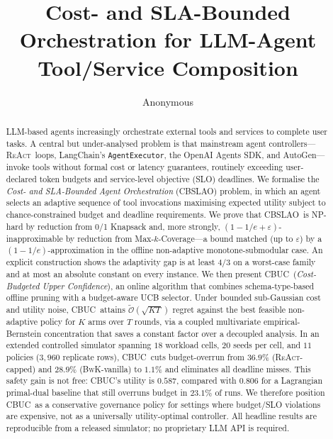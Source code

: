 \documentclass[runningheads]{llncs}
\title{Cost- and SLA-Bounded Orchestration for LLM-Agent Tool/Service Composition}
\author{Anonymous\inst{1}}
\institute{Anonymous Institution\\
\email{anon@example.org}}
\newcommand{\CBSLAO}{\textsc{CBSLAO}}
\newcommand{\CBUC}{\textsc{CBUC}}
\newcommand{\BwK}{\textsc{BwK}}
\newcommand{\ReAct}{\textsc{ReAct}}
\newcommand{\tOh}{\widetilde{\mathcal{O}}}
\begin{document}
\maketitle

\begin{abstract}
LLM-based agents increasingly orchestrate external tools and services
to complete user tasks. A central but under-analysed problem is that
mainstream agent controllers---\ReAct~loops, LangChain's
\texttt{AgentExecutor}, the OpenAI Agents SDK, and AutoGen---invoke
tools without formal cost or latency guarantees, routinely exceeding
user-declared token budgets and service-level objective (SLO) deadlines.
We formalise the \emph{Cost- and SLA-Bounded Agent Orchestration}
(\CBSLAO) problem, in which an agent selects an adaptive sequence of
tool invocations maximising expected utility subject to
chance-constrained budget and deadline requirements. We prove that
\CBSLAO~is NP-hard by reduction from 0/1 Knapsack and, more strongly,
$(1 - 1/e + \varepsilon)$-inapproximable by reduction from
Max-$k$-Coverage---a bound matched (up to $\varepsilon$) by a
$(1-1/e)$-approximation in the offline non-adaptive
monotone-submodular case. An explicit construction shows the
adaptivity gap is at least $4/3$ on a worst-case family and at most
an absolute constant on every instance. We then present \CBUC~(\emph{Cost-Budgeted Upper Confidence}), an
online algorithm that combines schema-type-based offline pruning with a
budget-aware UCB selector. Under bounded sub-Gaussian cost and utility
noise, \CBUC~attains $\tOh(\sqrt{KT})$ regret against the best
feasible non-adaptive policy for $K$ arms over $T$ rounds, via a
coupled multivariate empirical-Bernstein concentration that saves a
constant factor over a decoupled analysis.
In an extended controlled simulator spanning $18$ workload cells,
$20$ seeds per cell, and $11$ policies ($3{,}960$ replicate rows),
\CBUC~cuts budget-overrun from $36.9\%$ (\ReAct-capped) and $28.9\%$
(\BwK-vanilla) to $1.1\%$ and eliminates all deadline misses. This
safety gain is not free: \CBUC's utility is $0.587$, compared with
$0.806$ for a Lagrangian primal-dual baseline that still overruns
budget in $23.1\%$ of runs. We therefore position \CBUC~as a
conservative governance policy for settings where budget/SLO
violations are expensive, not as a universally utility-optimal
controller. All headline results are reproducible from a released
simulator; no proprietary LLM API is required.
\end{abstract}















\appendix

\end{document}
